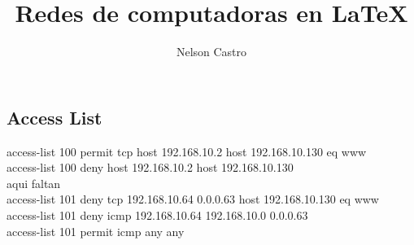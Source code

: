 \documentclass[12pt]{report}
\title{Redes de computadoras en \LaTeX}
\author{Nelson Castro}
\begin{document}
        \maketitle
        \newpage
        \subsection*{Access List}
        access-list 100 permit tcp host 192.168.10.2 host 192.168.10.130 eq www
        \\access-list 100 deny host 192.168.10.2 host 192.168.10.130
        \\aqui faltan
        \\access-list 101 deny tcp 192.168.10.64 0.0.0.63 host 192.168.10.130 eq www
        \\access-list 101 deny icmp 192.168.10.64 192.168.10.0 0.0.0.63
        \\access-list 101 permit icmp any any
    
\end{document}
